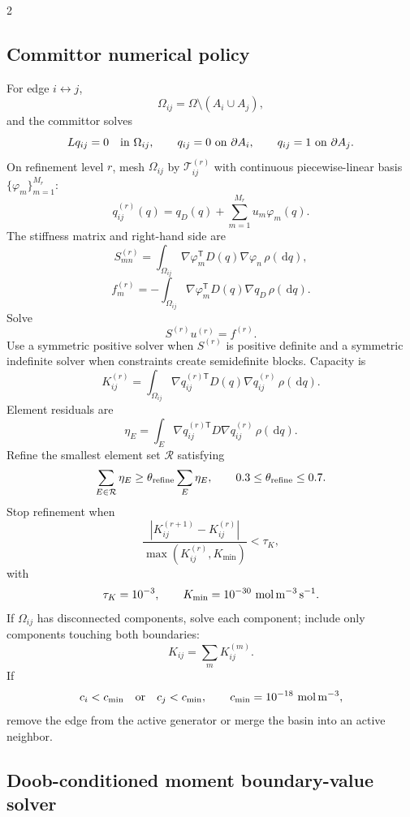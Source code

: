 \documentclass[10pt]{article}
\newcommand{\dd}{\,\mathrm d}
\newcommand{\T}{\mathsf{T}}
\begin{document}
\begin{multicols}{2}
\subsection{Committor numerical policy}

For edge \(i\leftrightarrow j\),
\[
\Omega_{ij}=\Omega\setminus(A_i\cup A_j),
\]
and the committor solves
\[
Lq_{ij}=0\quad{\rm in}\ \Omega_{ij},
\qquad
q_{ij}=0\ {\rm on}\ \partial A_i,
\qquad
q_{ij}=1\ {\rm on}\ \partial A_j.
\]
On refinement level \(r\), mesh \(\Omega_{ij}\) by \(\mathcal T_{ij}^{(r)}\)
with continuous piecewise-linear basis \(\{\varphi_m\}_{m=1}^{M_r}\):
\[
q_{ij}^{(r)}(q)=q_D(q)+\sum_{m=1}^{M_r}u_m\varphi_m(q).
\]
The stiffness matrix and right-hand side are
\[
S_{mn}^{(r)}
=
\int_{\Omega_{ij}}
\nabla\varphi_m^\T D(q)\nabla\varphi_n\,\rho(\dd q),
\]
\[
f_m^{(r)}
=
-
\int_{\Omega_{ij}}
\nabla\varphi_m^\T D(q)\nabla q_D\,\rho(\dd q).
\]
Solve
\[
S^{(r)}u^{(r)}=f^{(r)}.
\]
Use a symmetric positive solver when \(S^{(r)}\) is positive definite and a
symmetric indefinite solver when constraints create semidefinite blocks.
Capacity is
\[
K_{ij}^{(r)}
=
\int_{\Omega_{ij}}
\nabla q_{ij}^{(r)\T}D(q)\nabla q_{ij}^{(r)}\,\rho(\dd q).
\]
Element residuals are
\[
\eta_E=
\int_E\nabla q_{ij}^{(r)\T}D\nabla q_{ij}^{(r)}\,\rho(\dd q).
\]
Refine the smallest element set \(\mathcal R\) satisfying
\[
\sum_{E\in\mathcal R}\eta_E
\ge
\theta_{\rm refine}\sum_E\eta_E,
\qquad
0.3\le\theta_{\rm refine}\le0.7.
\]
Stop refinement when
\[
\frac{|K_{ij}^{(r+1)}-K_{ij}^{(r)}|}
{\max(K_{ij}^{(r)},K_{\min})}
<\tau_K,
\]
with
\[
\tau_K=10^{-3},
\qquad
K_{\min}=10^{-30}\ {\rm mol\,m^{-3}\,s^{-1}}.
\]
If \(\Omega_{ij}\) has disconnected components, solve each component; include
only components touching both boundaries:
\[
K_{ij}=\sum_mK_{ij}^{(m)}.
\]
If
\[
c_i<c_{\min}
\quad\text{or}\quad
c_j<c_{\min},
\qquad
c_{\min}=10^{-18}\ {\rm mol\,m^{-3}},
\]
remove the edge from the active generator or merge the basin into an active
neighbor.

\subsection{Doob-conditioned moment boundary-value solver}


\end{multicols}
\end{document}
